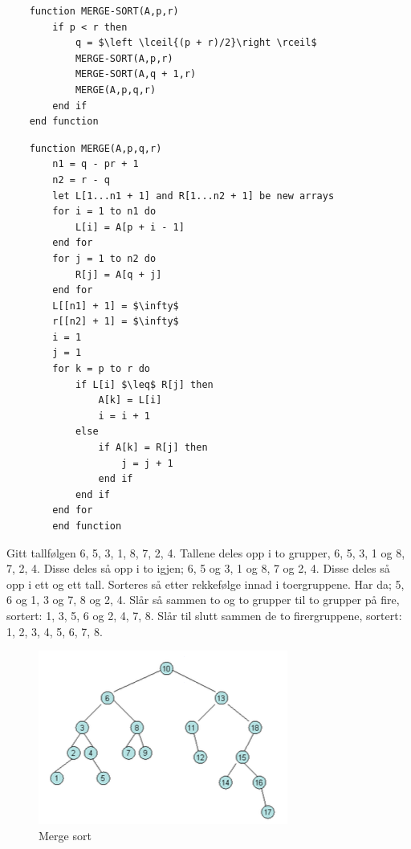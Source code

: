 \begin{lstlisting}
    function MERGE-SORT(A,p,r)
    	if p < r then
    		q = $\left \lceil{(p + r)/2}\right \rceil$
    		MERGE-SORT(A,p,r)
    		MERGE-SORT(A,q + 1,r)
    		MERGE(A,p,q,r)
    	end if
    end function
\end{lstlisting}

\begin{lstlisting}
    function MERGE(A,p,q,r)
	    n1 = q - pr + 1
    	n2 = r - q
	    let L[1...n1 + 1] and R[1...n2 + 1] be new arrays
        for i = 1 to n1 do
	        L[i] = A[p + i - 1]
        end for
        for j = 1 to n2 do
        	R[j] = A[q + j]
        end for
        L[[n1] + 1] = $\infty$
        r[[n2] + 1] = $\infty$
        i = 1
        j = 1
        for k = p to r do
        	if L[i] $\leq$ R[j] then
        		A[k] = L[i]
        		i = i + 1
        	else
        		if A[k] = R[j] then
        			j = j + 1
        		end if
        	end if
        end for
        end function
\end{lstlisting}

\begin{boxed}
Gitt tallfølgen 6, 5, 3, 1, 8, 7, 2, 4. Tallene deles opp i to grupper, 6, 5, 3, 1 og 8, 7, 2, 4. Disse deles så opp i to igjen; 6, 5 og 3, 1 og 8, 7 og 2, 4. Disse deles så opp i ett og ett tall. Sorteres så etter rekkefølge innad i toergruppene. Har da; 5, 6 og 1, 3 og 7, 8 og 2, 4. Slår så sammen to og to grupper til to grupper på fire, sortert: 1, 3, 5, 6 og 2, 4, 7, 8. Slår til slutt sammen de to firergruppene, sortert: 1, 2, 3, 4, 5, 6, 7, 8.

\begin{figure}[H]
\includegraphics[scale=0.7]{images/mergesort}
\centering %
\caption{Merge sort}
\label{fig:mergesort}
\end{figure}
\end{boxed}

